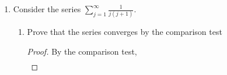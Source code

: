 \documentclass{article}
\begin{document}
\begin{enumerate}
\begin{enumerate}
                        \begin{proof}[Converges.]
                              By the comparison test,
                              \begin{align*}
                                    e^{-j+\sin j} & = \frac{e^{\sin j}}{e^j} \\
                                                  & \leq \frac{e}{e^j}
                              \end{align*}
                              and
                              \begin{align*}
                                    \sum \frac{e}{e^j} & = e\sum \frac{1}{e^j}               \\
                                                       & = e\sum \left(\frac{1}{e}\right)^j.
                              \end{align*}
                              This is a power series, which converges because the power term is less than 1.
                              Therefore, the series converges.
                        \end{proof}
                  \item $\sum\frac{j+\cos j}{j}$
                        \begin{proof}[verges.]
                              It is clear that
                              \begin{align*}
                                    \sum\frac{j+\cos j}{j} & = \sum\left(\frac{j}{j} + \frac{\cos j}{j}\right) \\
                                                           & = \sum(1) + \sum\left(\frac{\cos j}{j}\right).
                              \end{align*}
                              Without a doubt, $\sum(1)$ is divergent and therefore the series is divergent.
                        \end{proof}
            \end{enumerate}
            \setcounter{enumi}{3}
      \item Consider the series $\sum_{j=1}^\infty\frac{1}{j(j+1)}$.
            \begin{enumerate}
                  \item Prove that the series converges by the
                        comparison test
                        \begin{proof}
                              By the comparison test,
                              \begin{align*}

\end{align*}
\end{proof}
\end{enumerate}
\end{enumerate}
\end{document}
